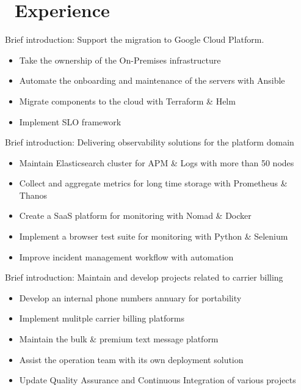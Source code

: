 \documentclass{resume}
\begin{document}



\section{\texorpdfstring{\textbf{}\ Experience}{Experience}}

Brief introduction: Support the migration to Google Cloud Platform.
\begin{itemize}
  \item Take the ownership of the On-Premises infrastructure
  \item Automate the onboarding and maintenance of the servers with Ansible
  \item Migrate components to the cloud with Terraform \& Helm
  \item Implement SLO framework
\end{itemize}

Brief introduction: Delivering observability solutions for the platform domain
\begin{itemize}
  \item Maintain Elasticsearch cluster for APM \& Logs with more than 50 nodes
  \item Collect and aggregate metrics for long time storage with Prometheus \& Thanos
  \item Create a SaaS platform for monitoring with Nomad \& Docker
  \item Implement a browser test suite for monitoring with Python \& Selenium
  \item Improve incident management workflow with automation
\end{itemize}

Brief introduction: Maintain and develop projects related to carrier billing
\begin{itemize}
  \item Develop an internal phone numbers annuary for portability
  \item Implement mulitple carrier billing platforms
  \item Maintain the bulk \& premium text message platform
  \item Assist the operation team with its own deployment solution
  \item Update Quality Assurance and Continuous Integration of various projects
\end{itemize}
\end{document}

